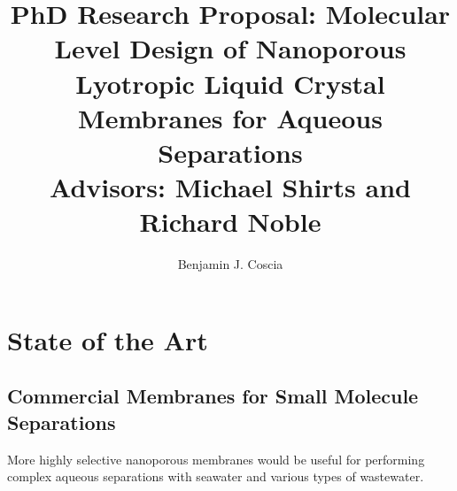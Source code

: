 \documentclass{article}
\title{PhD Research Proposal: Molecular Level Design of Nanoporous Lyotropic Liquid
Crystal Membranes for Aqueous Separations \\ \vspace{0.5cm}
\large Advisors: Michael Shirts and Richard Noble}
\author{Benjamin J. Coscia}
\begin{document}
  \graphicspath{{./figures/}}

  \maketitle
  \thispagestyle{empty}
  \clearpage
  \setcounter{page}{1} %

  \section{State of the Art}\label{section:state-of-the-art}

  \subsection*{Commercial Membranes for Small Molecule Separations}
  
  
  More highly selective nanoporous membranes would be useful for 
  performing complex aqueous separations with seawater and various
  types of wastewater.
\end{document}
